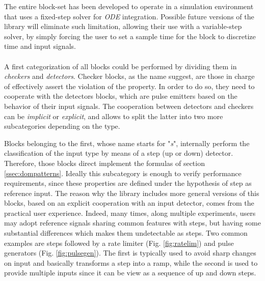 The entire block-set has been developed to operate in a simulation environment that uses a fixed-step solver for \textit{ODE} integration. Possible future versions of the library will eliminate such limitation, allowing their use with a variable-step solver, by simply forcing the user to set a sample time for the block to discretize time and input signals.
\paragraph{} A first categorization of all blocks could be performed by dividing them in \textit{checkers} and \textit{detectors}. Checker blocks, as the name suggest, are those in charge of effectively assert the violation of the property. In order to do so, they need to cooperate with the detectors blocks, which are pulse emitters based on the behavior of their input signals. The cooperation between detectors and checkers can be \textit{implicit} or \textit{explicit}, and allows to split the latter into two more subcategories depending on the type. 
\par Blocks belonging to the first, whose name starts for "\textit{s}", internally perform the classification of the input type by means of a step (up or down) detector. Therefore, those blocks direct implement the formulas of section \ref{ssec:dompatterns}. Ideally this subcategory is enough to verify performance requirements, since these properties are defined under the hypothesis of step as reference input. The reason why the library includes more general versions of this blocks, based on an explicit cooperation with an input detector, comes from the practical user experience. Indeed, many times, along multiple experiments, users may adopt reference signals sharing common features with steps, but having some substantial differences which makes them undetectable as steps. Two common examples are steps followed by a rate limiter (Fig. \ref{fig:ratelim}) and pulse generators (Fig. \ref{fig:pulsegen}). The first is typically used to avoid sharp changes on input and basically transforms a step into a ramp, while the second is used to provide multiple inputs since it can be view as a sequence of up and down steps.  
